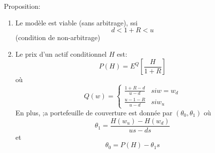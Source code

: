 \documentclass{article}
\begin{document}
Proposition: 
\begin{enumerate}
\item Le mod\`ele est viable (sans arbitrage), ssi
\begin{equation}
d<1+R<u
\end{equation}
(condition de non-arbitrage)

\item Le prix d'un actif conditionnel $H$ est:
\begin{equation}
P(H)=E^Q[\frac{H}{1+R}]
\end{equation} 
o\`u
\begin{equation}
Q(w) = \left\{\begin{array}{rcl}
	\frac{1+R-d}{u-d} & si w=w_d\\
\frac{u-1-R}{u-d} & si w_u
\end{array} \right.
\end{equation}
En plus, ;a portefeuille de couverture est donn\'ee par $(\theta_0,\theta_1)$ o\`u 
\begin{equation}
\theta_1=\frac{H(w_u)-H(w_d)}{us-ds}
\end{equation}
et
\begin{equation}
\theta_0=P(H)-\theta_1 s
\end{equation}
\end{enumerate}
\end{document}
